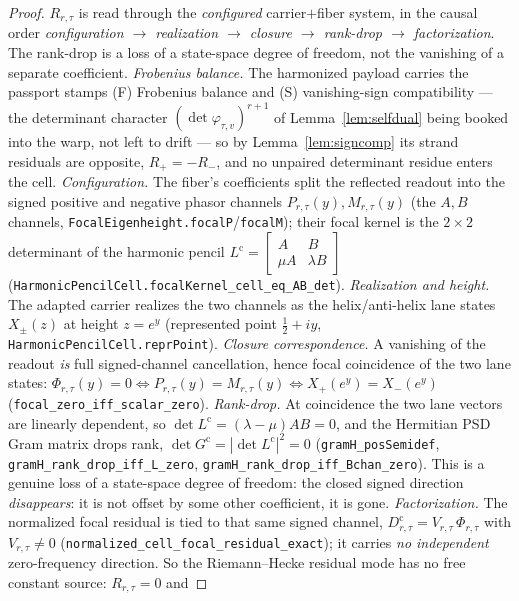\documentclass[11pt]{article}
\theoremstyle{definition}
\begin{document}
\begin{proof}
$R_{r,\tau}$ is read through the \emph{configured} carrier$+$fiber system, in the causal order
\emph{configuration $\to$ realization $\to$ closure $\to$ rank-drop $\to$ factorization}. The rank-drop is a
loss of a state-space degree of freedom, not the vanishing of a separate coefficient.
\emph{Frobenius balance.} The harmonized payload carries the passport stamps (F) Frobenius balance and
(S) vanishing-sign compatibility --- the determinant character $(\det\varphi_{\tau,v})^{r+1}$ of
Lemma~\ref{lem:selfdual} being booked into the warp, not left to drift --- so by
Lemma~\ref{lem:signcomp} its strand residuals are opposite, $R_+=-R_-$, and no unpaired determinant residue
enters the cell.
\emph{Configuration.} The fiber's coefficients split the reflected readout into the signed positive and
negative phasor channels $P_{r,\tau}(y),M_{r,\tau}(y)$ (the $A,B$ channels,
\texttt{FocalEigenheight.focalP}/\texttt{focalM}); their focal kernel is the $2\times2$ determinant of the
harmonic pencil $L^{\mathrm c}=\left[\begin{smallmatrix}A&B\\ \mu A&\lambda B\end{smallmatrix}\right]$
(\texttt{HarmonicPencilCell.focalKernel\_cell\_eq\_AB\_det}).
\emph{Realization and height.} The adapted carrier realizes the two channels as the helix/anti-helix lane
states $X_{\pm}(z)$ at height $z=e^{y}$ (represented point $\tfrac12+iy$, \texttt{HarmonicPencilCell.reprPoint}).
\emph{Closure correspondence.} A vanishing of the readout \emph{is} full signed-channel cancellation, hence
focal coincidence of the two lane states:
$\Phi_{r,\tau}(y)=0\iff P_{r,\tau}(y)=M_{r,\tau}(y)\iff X_{+}(e^{y})=X_{-}(e^{y})$
(\texttt{focal\_zero\_iff\_scalar\_zero}).
\emph{Rank-drop.} At coincidence the two lane vectors are linearly dependent, so
$\det L^{\mathrm c}=(\lambda-\mu)AB=0$, and the Hermitian PSD Gram matrix drops rank,
$\det G^{\mathrm c}=|\det L^{\mathrm c}|^{2}=0$ (\texttt{gramH\_posSemidef},
\texttt{gramH\_rank\_drop\_iff\_L\_zero}, \texttt{gramH\_rank\_drop\_iff\_Bchan\_zero}). This is a genuine
loss of a state-space degree of freedom: the closed signed direction \emph{disappears}: it is not offset by
some other coefficient, it is gone.
\emph{Factorization.} The normalized focal residual is tied to that same signed channel,
$D^{\mathrm c}_{r,\tau}=V_{r,\tau}\,\Phi_{r,\tau}$ with $V_{r,\tau}\neq0$
(\texttt{normalized\_cell\_focal\_residual\_exact}); it carries \emph{no independent} zero-frequency
direction. So the Riemann--Hecke residual mode has no free constant source: $R_{r,\tau}=0$ and

\end{proof}
\end{document}
